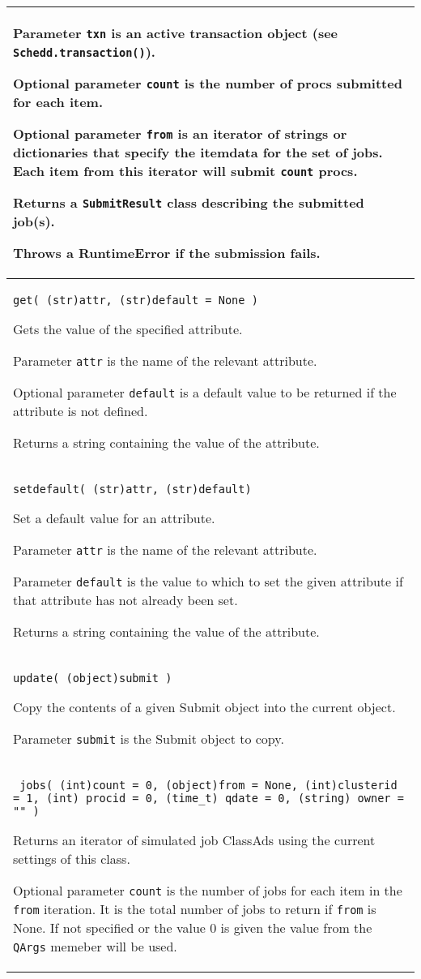 \begin{flushleft}
\begin{longtable}{|p{16cm}|}
Parameter \texttt{txn} is an active transaction object (see \texttt{Schedd.transaction()}).

Optional parameter \texttt{count} is the number of procs submitted for each item.

Optional parameter \texttt{from} is an iterator of strings or dictionaries that specify the itemdata for the set of jobs.
Each item from this iterator will submit \texttt{count} procs.

Returns a \texttt{SubmitResult} class describing the submitted job(s).

Throws a RuntimeError if the submission fails.

\\ \hline
\texttt{get( (str)attr, (str)default = None )}

Gets the value of the specified attribute.

Parameter \texttt{attr} is the name of the relevant attribute.

Optional parameter \texttt{default} is a default value to be returned
if the attribute is not defined.

Returns a string containing the value of the attribute.

\\ \hline
\texttt{setdefault( (str)attr, (str)default)}

Set a default value for an attribute.

Parameter \texttt{attr} is the name of the relevant attribute.

Parameter \texttt{default} is the value to which to set the given
attribute if that attribute has not already been set.

Returns a string containing the value of the attribute.

\\ \hline
\texttt{update( (object)submit )}

Copy the contents of a given Submit object into the current object.

Parameter \texttt{submit} is the Submit object to copy.

\\ \hline

\texttt{ jobs( (int)count = 0, (object)from = None, (int)clusterid = 1, (int) procid = 0, (time\_t) qdate = 0, (string) owner = "" )}

Returns an iterator of simulated job ClassAds using the current settings of this class.

Optional parameter \texttt{count} is the number of jobs for each item in the \texttt{from} iteration. 
It is the total number of jobs to return if \texttt{from} is None.  If not specified or the value 0 is given
the value from the \texttt{QArgs} memeber will be used.


\end{longtable}
\end{flushleft}
